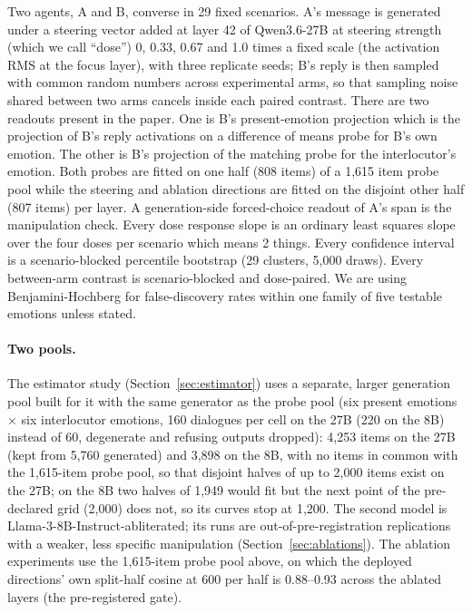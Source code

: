 \documentclass{article}
\begin{document}
Two agents, A and B, converse in 29 fixed scenarios. A's message is generated under a steering vector added at layer 42 of Qwen3.6-27B at steering strength (which we call ``dose'') 0, 0.33, 0.67 and 1.0 times a fixed scale (the activation RMS at the focus layer), with three replicate seeds; B's reply is then sampled with common random numbers across experimental arms, so that sampling noise shared between two arms cancels inside each paired contrast. There are two readouts present in the paper. One is B's present-emotion projection which is the projection of B's reply activations on a difference of means probe for B's own emotion. The other is B's projection of the matching probe for the interlocutor's emotion. Both probes are fitted on one half (808 items) of a 1,615 item probe pool while the steering and ablation directions are fitted on the disjoint other half (807 items) per layer. A generation-side forced-choice readout of A's span is the manipulation check. Every dose response slope is an ordinary least squares slope over the four doses per scenario which means 2 things. Every confidence interval is a scenario-blocked percentile bootstrap \citep{efron1993bootstrap} (29 clusters, 5,000 draws). Every between-arm contrast is scenario-blocked and dose-paired. We are using Benjamini-Hochberg \citep{benjamini1995fdr} for false-discovery rates within one family of five testable emotions unless stated.

\paragraph{Two pools.} The estimator study (Section~\ref{sec:estimator}) uses a separate, larger generation pool built for it with the same generator as the probe pool (six present emotions $\times$ six interlocutor emotions, 160 dialogues per cell on the 27B (220 on the 8B) instead of 60, degenerate and refusing outputs dropped): 4,253 items on the 27B (kept from 5,760 generated) and 3,898 on the 8B, with no items in common with the 1,615-item probe pool, so that disjoint halves of up to 2,000 items exist on the 27B; on the 8B two halves of 1,949 would fit but the next point of the pre-declared grid (2,000) does not, so its curves stop at 1,200. The second model is Llama-3-8B-Instruct-abliterated; its runs are out-of-pre-registration replications with a weaker, less specific manipulation (Section~\ref{sec:ablations}). The ablation experiments use the 1,615-item probe pool above, on which the deployed directions' own split-half cosine at 600 per half is 0.88--0.93 across the ablated layers (the pre-registered gate).
\end{document}
